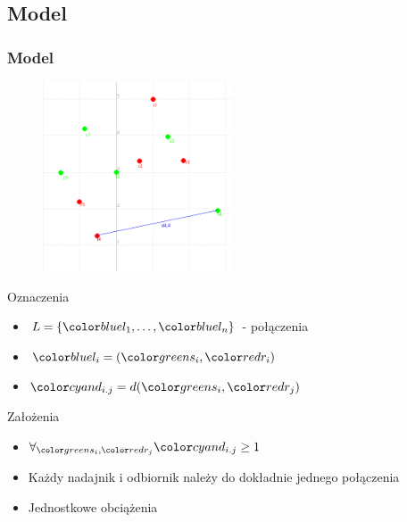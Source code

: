 \documentclass[polish, t,10pt]{beamer}
\begin{document}
\subsection{Model}
    \begin{frame}
        \frametitle{Model}
        \begin{figure}
            \includegraphics[width=0.5\textwidth]{pictures/model-variables.png}
        \end{figure}
        Oznaczenia
        \begin{itemize}
            \item $L = \{\lo, \ldots, \ln\}$ - połączenia
            \item $\li = (\si, \ri)$
            \item $\dij = d(\si, \rj)$
        \end{itemize}
        Założenia
        \begin{itemize}
            \item $\forall_{\si, \rj} \dij \geq 1$
            \item Każdy nadajnik i odbiornik należy do dokładnie jednego połączenia
            \item Jednostkowe obciążenia
        \end{itemize}
    \end{frame}
\end{document}
